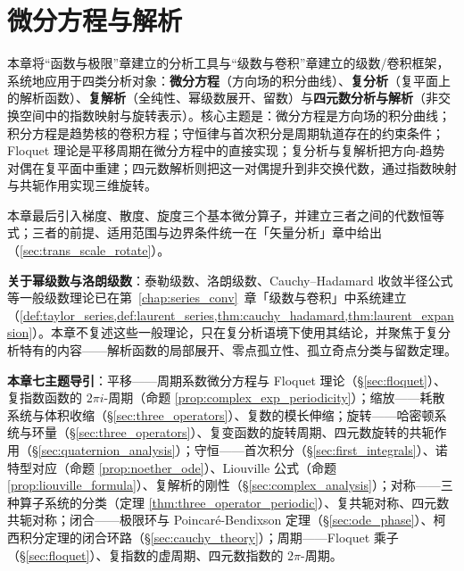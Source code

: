 \chapter{微分方程与解析}
\label{chap:diffeq_complex}

\begin{remark}[本章定位]\label{rem:diffeq_chapter_positioning}
本章将“函数与极限”章建立的分析工具与“级数与卷积”章建立的级数/卷积框架，系统地应用于四类分析对象：\textbf{微分方程}（方向场的积分曲线）、\textbf{复分析}（复平面上的解析函数）、\textbf{复解析}（全纯性、幂级数展开、留数）与\textbf{四元数分析与解析}（非交换空间中的指数映射与旋转表示）。核心主题是：微分方程是方向场的积分曲线；积分方程是趋势核的卷积方程；守恒律与首次积分是周期轨道存在的约束条件；Floquet 理论是平移周期在微分方程中的直接实现；复分析与复解析把方向-趋势对偶在复平面中重建；四元数解析则把这一对偶提升到非交换代数，通过指数映射与共轭作用实现三维旋转。

本章最后引入梯度、散度、旋度三个基本微分算子，并建立三者之间的代数恒等式；三者的前提、适用范围与边界条件统一在「矢量分析」章中给出（\cref{sec:trans_scale_rotate}）。

\textbf{关于幂级数与洛朗级数}：泰勒级数、洛朗级数、Cauchy–Hadamard 收敛半径公式等一般级数理论已在第~\ref{chap:series_conv}~章「级数与卷积」中系统建立（\cref{def:taylor_series,def:laurent_series,thm:cauchy_hadamard,thm:laurent_expansion}）。本章不复述这些一般理论，只在复分析语境下使用其结论，并聚焦于复分析特有的内容——解析函数的局部展开、零点孤立性、孤立奇点分类与留数定理。

\textbf{本章七主题导引}：平移——周期系数微分方程与 Floquet 理论（\S\ref{sec:floquet}）、复指数函数的 $2\pi i$-周期（命题 \ref{prop:complex_exp_periodicity}）；缩放——耗散系统与体积收缩（\S\ref{sec:three_operators}）、复数的模长伸缩；旋转——哈密顿系统与环量（\S\ref{sec:three_operators}）、复变函数的旋转周期、四元数旋转的共轭作用（\S\ref{sec:quaternion_analysis}）；守恒——首次积分（\S\ref{sec:first_integrals}）、诺特型对应（命题 \ref{prop:noether_ode}）、Liouville 公式（命题 \ref{prop:liouville_formula}）、复解析的刚性（\S\ref{sec:complex_analysis}）；对称——三种算子系统的分类（定理 \ref{thm:three_operator_periodic}）、复共轭对称、四元数共轭对称；闭合——极限环与 Poincaré-Bendixson 定理（\S\ref{sec:ode_phase}）、柯西积分定理的闭合环路（\S\ref{sec:cauchy_theory}）；周期——Floquet 乘子（\S\ref{sec:floquet}）、复指数的虚周期、四元数指数的 $2\pi$-周期。
\end{remark}

